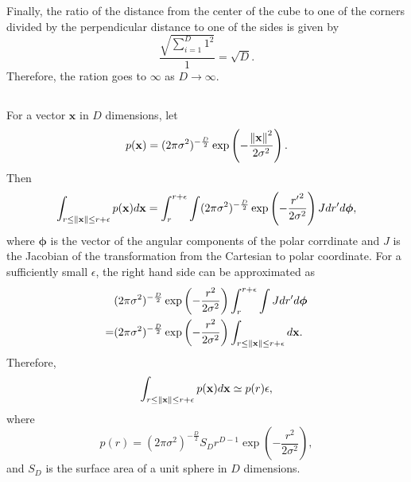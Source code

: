 Finally, the ratio of the distance from the center of the cube to one of the corners divided by the perpendicular distance to one of the sides is given by
%
\begin{equation}
\frac{\sqrt{\sum_{i = 1}^{D} 1 ^ 2}}{1} 
= 
\sqrt{D}.
\end{equation}
%
Therefore, the ration goes to $\infty$ as $D \to \infty$.


\subsection{}
\label{1.20}
For a vector $\mathbf{x}$ in $D$ dimensions, let 
%
\begin{equation}
p(\mathbf{x}) 
= 
(2 \pi \sigma ^ 2) ^ {- \frac{D}{2}} 
\exp 
\left( 
	- 
	\frac{\norm{\mathbf{x}} ^ 2}{2 \sigma ^2} 
\right).
\end{equation}
%
Then
%
\begin{equation}
\int_{r \leq \norm{\mathbf{x}} \leq r + \epsilon} 
p(\mathbf{x}) 
d\mathbf{x} 
= 
\int_{r}^{r + \epsilon} 
\int (2 \pi \sigma ^ 2) ^ {- \frac{D}{2}} 
\exp 
\left( 
	- 
	\frac{{r'} ^ 2}{2 \sigma ^2} 
\right) 
J 
dr' 
d\bm{\phi},
\end{equation}
%
where $\bm{\phi}$ is the vector of the angular components of the polar corrdinate and $J$ is the Jacobian of the transformation from the Cartesian to polar coordinate.
For a sufficiently small $\epsilon$, the right hand side can be approximated as
%
\begin{equation}
\begin{aligned}
&
(2 \pi \sigma ^ 2) ^ {- \frac{D}{2}} 
\exp 
\left( 
	- 
	\frac{r ^ 2}{2 \sigma ^2} 
\right) 
\int_{r}^{r + \epsilon} 
\int 
J 
dr' 
d\bm{\phi} 
\\
=& 
(2 \pi \sigma ^ 2) ^ {- \frac{D}{2}} 
\exp 
\left( 
	- 
	\frac{r ^ 2}{2 \sigma ^2} 
\right) 
\int_{r \leq \norm{\mathbf{x}} \leq r + \epsilon} 
d\mathbf{x}.
\end{aligned}
\end{equation}
%
Therefore,
%
\begin{equation}
\int_{r \leq \norm{\mathbf{x}} \leq r + \epsilon} 
p(\mathbf{x}) 
d\mathbf{x} 
\simeq 
p(r) 
\epsilon,
\end{equation}
%
where
%
\begin{equation}
p(r) 
= 
(2 \pi \sigma ^ 2) ^ {- \frac{D}{2}} 
S_D 
r ^ {D - 1} 
\exp 
\left( 
	- 
	\frac{r ^ 2}{2 \sigma ^2} 
\right),
\end{equation}
%
and $S_D$ is the surface area of a unit sphere in $D$ dimensions.

